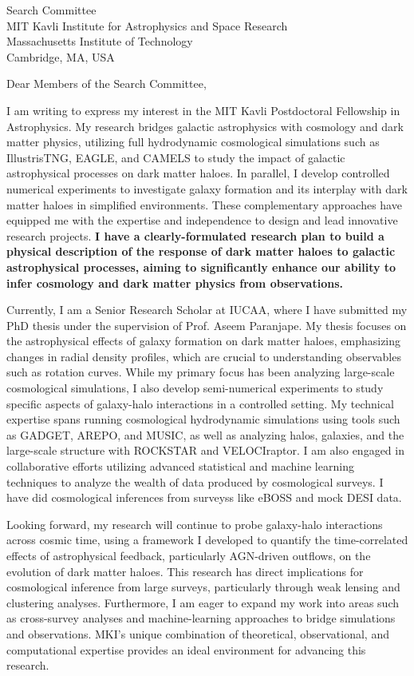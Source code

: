 \documentclass[11pt]{letter}
\begin{document}
\begin{letter}{Search Committee \\ MIT Kavli Institute for Astrophysics and Space Research \\ Massachusetts Institute of Technology \\ Cambridge, MA, USA}

\opening{Dear Members of the Search Committee,}

I am writing to express my interest in the MIT Kavli Postdoctoral Fellowship in Astrophysics. My research bridges galactic astrophysics with cosmology and dark matter physics, utilizing full hydrodynamic cosmological simulations such as IllustrisTNG, EAGLE, and CAMELS to study the impact of galactic astrophysical processes on dark matter haloes. In parallel, I develop controlled numerical experiments to investigate galaxy formation and its interplay with dark matter haloes in simplified environments. These complementary approaches have equipped me with the expertise and independence to design and lead innovative research projects. \textbf{I have a clearly-formulated research plan to build a physical description of the response of dark matter haloes to galactic astrophysical processes, aiming to significantly enhance our ability to infer cosmology and dark matter physics from observations.}

Currently, I am a Senior Research Scholar at IUCAA, where I have submitted my PhD thesis under the supervision of Prof. Aseem Paranjape. My thesis focuses on the astrophysical effects of galaxy formation on dark matter haloes, emphasizing changes in radial density profiles, which are crucial to understanding observables such as rotation curves. While my primary focus has been analyzing large-scale cosmological simulations, I also develop semi-numerical experiments to study specific aspects of galaxy-halo interactions in a controlled setting. My technical expertise spans running cosmological hydrodynamic simulations using tools such as GADGET, AREPO, and MUSIC, as well as analyzing halos, galaxies, and the large-scale structure with ROCKSTAR and VELOCIraptor. I am also engaged in collaborative efforts utilizing advanced statistical and machine learning techniques to analyze the wealth of data produced by cosmological surveys. I have did cosmological inferences from surveyss like eBOSS and mock DESI data.

Looking forward, my research will continue to probe galaxy-halo interactions across cosmic time, using a framework I developed to quantify the time-correlated effects of astrophysical feedback, particularly AGN-driven outflows, on the evolution of dark matter haloes. This research has direct implications for cosmological inference from large surveys, particularly through weak lensing and clustering analyses. Furthermore, I am eager to expand my work into areas such as cross-survey analyses and machine-learning approaches to bridge simulations and observations. MKI's unique combination of theoretical, observational, and computational expertise provides an ideal environment for advancing this research.


\end{letter}
\end{document}

